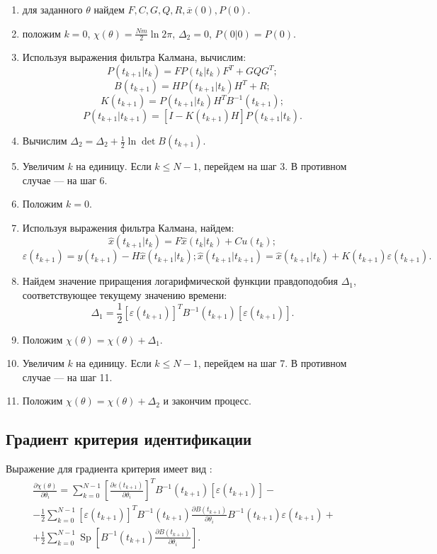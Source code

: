 \documentclass[a4paper,14pt]{extarticle}
\DeclareMathOperator{\Sp}{Sp}
\renewcommand{\vec}[1]{#1}
\newcommand{\eps}{\varepsilon}
\begin{document}
\begin{enumerate}
\item для заданного $\theta$  найдем $F, C, G, Q, R, \overline{\vec{x}}(0),
P(0)$.
\item положим $k = 0$, $\chi(\theta) = \frac{Nm}{2} \ln{2\pi}$, $\Delta_2 = 0$,
$P(0|0) = P(0)$.
\item Используя выражения фильтра Калмана, вычислим:
\[
  P(t_{k+1}|t_k) = F P(t_k|t_k) F^T + GQG^T;
\]
\[
  B(t_{k+1}) = H P(t_{k+1}|t_k) H^T + R;
\]
\[
  K(t_{k+1}) = P(t_{k+1}|t_k) H^T B^{-1}(t_{k+1});
\]
\[
  P(t_{k+1}|t_{k+1}) = \left[ I - K(t_{k+1}) H \right] P(t_{k+1}|t_k).
\]
\item Вычислим $\Delta_2 = \Delta_2 + \frac{1}{2} \ln \det B(t_{k+1})$.
\item Увеличим $k$ на единицу. Если $k \le N-1$, перейдем на шаг 3. В противном
случае --- на шаг 6.
\item Положим $k = 0$.
\item Используя выражения фильтра Калмана, найдем:
\[
  \hat{x}(t_{k+1}|t_k) = F \hat{x}(t_k|t_k) + C u(t_k);
\]
\[
  \eps(t_{k+1}) = y(t_{k+1}) - H \hat{x} (t_{k+1}|t_k);
  \hat{x}(t_{k+1}|t_{k+1}) = \hat{x}(t_{k+1}|t_k) + K(t_{k+1}) \eps(t_{k+1}).
\]
\item Найдем значение приращения логарифмической функции правдоподобия
$\Delta_1$, соответствующее текущему значению времени:
\[
  \Delta_1 = \frac{1}{2} \left[ \eps(t_{k+1}) \right]^T B^{-1}(t_{k+1}) 
  \left[ \eps(t_{k+1}) \right].
\]
\item Положим $\chi(\theta) = \chi(\theta) + \Delta_1$.
\item Увеличим $k$ на единицу. Если $k \le N-1$, перейдем на шаг 7.
В противном случае --- на шаг 11.
\item Положим $\chi(\theta) = \chi(\theta) + \Delta_2$ и закончим процесс.
\end{enumerate}

\subsection{Градиент критерия идентификации}

Выражение для градиента критерия имеет вид \cite{mono}:
\begin{equation*}
\begin{split}
  \frac{\partial \chi(\theta)}{\partial \theta_i} = \sum\limits_{k=0}^{N-1}
  \left[ \frac{\partial \eps(t_{k+1})}{\partial \theta_i} \right]^T
  B^{-1}(t_{k+1}) \left[ \eps(t_{k+1}) \right] - \\
  - \frac{1}{2}
  \sum\limits_{k=0}^{N-1} \left[ \eps(t_{k+1}) \right]^T B^{-1}(t_{k+1})
  \frac{\partial B(t_{k+1})}{\partial \theta_i} B^{-1}(t_{k+1}) \eps(t_{k+1}) +
  \\ + 
  \frac{1}{2} \sum\limits_{k=0}^{N-1} \Sp \left[ B^{-1}(t_{k+1})
  \frac{\partial B(t_{k+1})}{\partial \theta_i} \right]. 
\end{split}
\end{equation*}
\end{document}
